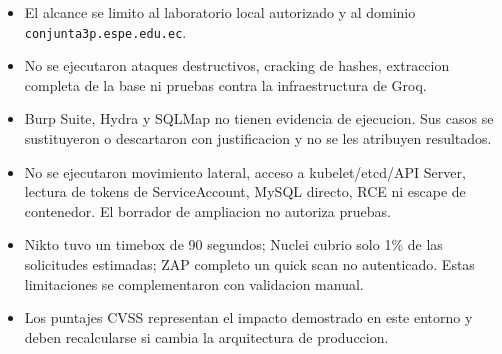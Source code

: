 \begin{itemize}
  \item El alcance se limito al laboratorio local autorizado y al dominio
  \texttt{conjunta3p.espe.edu.ec}.
  \item No se ejecutaron ataques destructivos, cracking de hashes, extraccion
  completa de la base ni pruebas contra la infraestructura de Groq.
  \item Burp Suite, Hydra y SQLMap no tienen evidencia de ejecucion. Sus
  casos se sustituyeron o descartaron con justificacion y no se les atribuyen
  resultados.
  \item No se ejecutaron movimiento lateral, acceso a kubelet/etcd/API Server,
  lectura de tokens de ServiceAccount, MySQL directo, RCE ni escape de
  contenedor. El borrador de ampliacion no autoriza pruebas.
  \item Nikto tuvo un timebox de 90 segundos; Nuclei cubrio solo 1\% de las
  solicitudes estimadas; ZAP completo un quick scan no autenticado. Estas
  limitaciones se complementaron con validacion manual.
  \item Los puntajes CVSS representan el impacto demostrado en este entorno y
  deben recalcularse si cambia la arquitectura de produccion.
\end{itemize}
